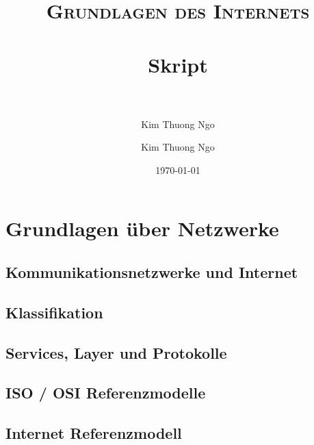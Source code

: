 \documentclass[paper=a4, fontsize=11pt]{scrartcl}
\author{Kim Thuong Ngo}
\title{	
\normalfont \normalsize 
\textsc{Grundlagen des Internets} \\ [25pt] 
\horrule{0.5pt} \\[0.4cm] 
\huge Skript \\ 
\horrule{2pt} \\[0.5cm] 
}
\author{Kim Thuong Ngo}
\date{\normalsize\today}
\numberwithin{equation}{section}
\numberwithin{figure}{section}
\numberwithin{table}{section}
\begin{document}
\maketitle 

\newpage

\tableofcontents

\newpage


\section{Grundlagen über Netzwerke}


\subsection{Kommunikationsnetzwerke und Internet}


\subsection{Klassifikation}


\subsection{Services, Layer und Protokolle}


\subsection{ISO / OSI Referenzmodelle}


\subsection{Internet Referenzmodell}

\end{document}
